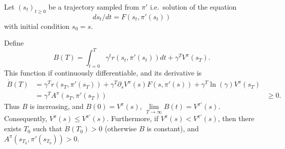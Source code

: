 Let $(s_t)_{t\geq 0}$ be a trajectory sampled from $\pi'$ i.e.\ solution of the equation
\begin{equation}
	ds_t / dt = F(s_t, \pi'(s_t))
\end{equation}
with initial condition $s_0 = s$.

Define
\begin{equation}
	B(T) = \int_{t=0}^T \gamma^t r(s_t, \pi'(s_t)) dt + \gamma^T V^\pi(s_T).
\end{equation}
This function if continuously differentiable, and its derivative is
\begin{align}
	\dot{B}(T) &= \gamma^T r(s_T, \pi'(s_T)) + \gamma^T \partial_s V^\pi(s) F(s, \pi'(s)) + \gamma^T \ln(\gamma) V^\pi(s_T)\\
		   &= \gamma^T A^\pi(s_T, \pi'(s_T))
		   &\geq 0.
\end{align}
Thus $B$ is increasing, and $B(0) = V^\pi(s)$, $\lim\limits_{T\rightarrow \infty} B(t) = V^{\pi'}(s)$.
Consequently, $V^\pi(s) \leq V^{\pi'}(s)$.
Furthermore, if $V^\pi(s) < V^{\pi'}(s)$, then there exists $T_0$ such that $\dot B(T_0) > 0$ (otherwise $B$ is constant), and $A^\pi(s_{T_0}, \pi'(s_{T_0})) > 0$.

